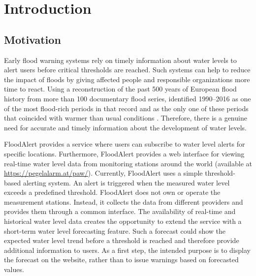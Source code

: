 \chapter{Introduction}

\section{Motivation}
Early flood warning systems rely on timely information about water levels to alert users before critical thresholds are reached. Such systems can help to reduce the impact of floods by giving affected people and responsible organizations more time to react. Using a reconstruction of the past 500 years of European flood history from more than 100 documentary flood series, \citeauthor{bloschlCurrentEuropeanFloodrich2020} identified 1990--2016 as one of the most flood-rich periods in that record and as the only one of these periods that coincided with warmer than usual conditions \cite{bloschlCurrentEuropeanFloodrich2020}. Therefore, there is a genuine need for accurate and timely information about the development of water levels.

FloodAlert \cite{FloodAlertWaterLevels} provides a service where users can subscribe to water level alerts for specific locations. Furthermore, FloodAlert provides a web interface for viewing real-time water level data from monitoring stations around the world (available at \url{https://pegelalarm.at/paw/}). Currently, FloodAlert uses a simple threshold-based alerting system. An alert is triggered when the measured water level exceeds a predefined threshold. FloodAlert does not own or operate the measurement stations. Instead, it collects the data from different providers and provides them through a common interface. The availability of real-time and historical water level data creates the opportunity to extend the service with a short-term water level forecasting feature. Such a forecast could show the expected water level trend before a threshold is reached and therefore provide additional information to users. As a first step, the intended purpose is to display the forecast on the website, rather than to issue warnings based on forecasted values.

